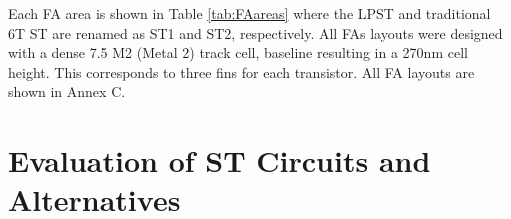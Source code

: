 \documentclass[pgmicro,diss,english]{iiufrgs}
\begin{document}
Each FA area is shown in Table \ref{tab:FAareas} where the LPST and traditional 6T ST are renamed as ST1 and ST2, respectively. All FAs layouts were designed with a dense 7.5 M2 (Metal 2) track cell, baseline resulting in a 270nm cell height. This corresponds to three fins for each transistor. All FA layouts are shown in Annex C.

\begin{table}[H]
\centering
\caption{Each Full Adder area with the ST technique applied where ST1 and ST2 corresponds to the LPST and 6T ST, respectively.}
\label{tab:FAareas}
\end{table}



\chapter{Evaluation of ST Circuits and Alternatives}
\end{document}
